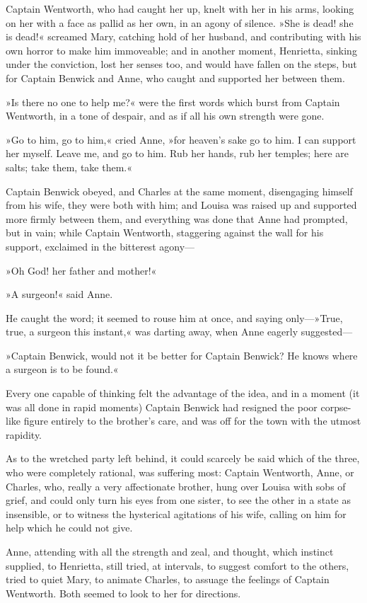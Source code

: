 Captain Wentworth, who had caught her up, knelt with her in his arms, looking on her with a face as pallid as her own, in an agony of silence. »She is dead! she is dead!« screamed Mary, catching hold of her husband, and contributing with his own horror to make him immoveable; and in another moment, Henrietta, sinking under the conviction, lost her senses too, and would have fallen on the steps, but for Captain Benwick and Anne, who caught and supported her between them.

»Is there no one to help me?« were the first words which burst from Captain Wentworth, in a tone of despair, and as if all his own strength were gone.

»Go to him, go to him,« cried Anne, »for heaven's sake go to him. I can support her myself. Leave me, and go to him. Rub her hands, rub her temples; here are salts; take them, take them.«

Captain Benwick obeyed, and Charles at the same moment, disengaging himself from his wife, they were both with him; and Louisa was raised up and supported more firmly between them, and everything was done that Anne had prompted, but in vain; while Captain Wentworth, staggering against the wall for his support, exclaimed in the bitterest agony—

»Oh God! her father and mother!«

»A surgeon!« said Anne.

He caught the word; it seemed to rouse him at once, and saying only—»True, true, a surgeon this instant,« was darting away, when Anne eagerly suggested—

»Captain Benwick, would not it be better for Captain Benwick? He knows where a surgeon is to be found.«

Every one capable of thinking felt the advantage of the idea, and in a moment (it was all done in rapid moments) Captain Benwick had resigned the poor corpse-like figure entirely to the brother's care, and was off for the town with the utmost rapidity.

As to the wretched party left behind, it could scarcely be said which of the three, who were completely rational, was suffering most: Captain Wentworth, Anne, or Charles, who, really a very affectionate brother, hung over Louisa with sobs of grief, and could only turn his eyes from one sister, to see the other in a state as insensible, or to witness the hysterical agitations of his wife, calling on him for help which he could not give.

Anne, attending with all the strength and zeal, and thought, which instinct supplied, to Henrietta, still tried, at intervals, to suggest comfort to the others, tried to quiet Mary, to animate Charles, to assuage the feelings of Captain Wentworth. Both seemed to look to her for directions.

